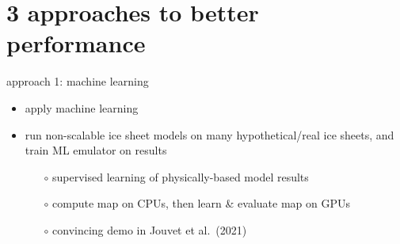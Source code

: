 \documentclass[svgnames,
               hyperref={colorlinks,citecolor=DeepPink4,linkcolor=FireBrick,urlcolor=Maroon},
               usepdftitle=false]  %
               {beamer}
\begin{document}
\section{3 approaches to better performance}

\begin{frame}{approach 1: machine learning}

\begin{itemize}
\item apply \alert{machine learning}
\item run non-scalable ice sheet models on many hypothetical/real ice sheets, and train ML \alert{emulator} on results
    \begin{itemize}
    \item[$\circ$] supervised learning of physically-based model results
    \item[$\circ$] compute map on CPUs, then learn \& evaluate map on GPUs
    \item[$\circ$] convincing demo in Jouvet et al.~(2021)
    \end{itemize}
\end{itemize}

\vspace{3mm}
\begin{minipage}[t][60cm][t]{\textwidth}
\begin{center}
\end{center}
\end{minipage}
\end{frame}
\end{document}

